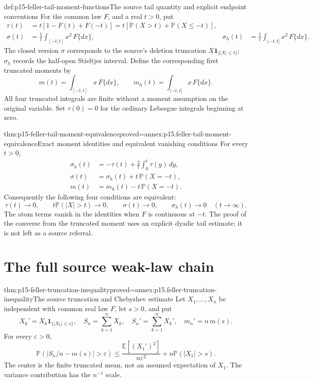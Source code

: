 \begin{hbdefinition}{def:p15-feller-tail-moment-functions}{The source tail quantity and explicit endpoint conventions}
For the common law \(F\), and a real \(t>0\), put
\[
 \begin{aligned}
 \tau(t)&=t[1-F(t)+F(-t)]
       =t[\mathbb P(X>t)+\mathbb P(X\leq-t)],\\
 \sigma(t)&=\frac1t\int_{[-t,t]}x^2\,F\{dx\},&
 \sigma_h(t)&=\frac1t\int_{(-t,t]}x^2\,F\{dx\}.
 \end{aligned}
\]
The closed version \(\sigma\) corresponds to the source's deletion
truncation \(X\mathbf1_{\{|X|\leq t\}}\); \(\sigma_h\) records
the half-open Stieltjes interval. Define the corresponding first
truncated moments by
\[
 m(t)=\int_{[-t,t]}x\,F\{dx\},\qquad
 m_h(t)=\int_{(-t,t]}x\,F\{dx\}.
\]
All four truncated integrals are finite without a moment assumption
on the original variable. Set \(\tau(0)=0\) for the ordinary
Lebesgue integrals beginning at zero.
\end{hbdefinition}

\begin{hbtheorem}{thm:p15-feller-tail-moment-equivalence}{proved=annex:p15.feller-tail-moment-equivalence}{Exact moment identities and equivalent vanishing conditions}
For every \(t>0\),
\[
 \begin{aligned}
 \sigma_h(t)&=-\tau(t)+\frac2t\int_0^t\tau(y)\,dy,\\
 \sigma(t)&=\sigma_h(t)+t\,\mathbb P(X=-t),\\
 m(t)&=m_h(t)-t\,\mathbb P(X=-t).
 \end{aligned}
\]
Consequently the following four conditions are equivalent:
\[
 \tau(t)\to0,\qquad
 t\mathbb P(|X|>t)\to0,\qquad
 \sigma(t)\to0,\qquad
 \sigma_h(t)\to0
                         \quad(t\to\infty).
\]
The atom terms vanish in the identities when \(F\) is continuous at
\(-t\). The proof of the converse from the truncated moment uses an
explicit dyadic tail estimate; it is not left as a source referral.
\end{hbtheorem}

\section{The full source weak-law chain}
\label{sec:p15-feller-generalized-weak-law}

\begin{hbtheorem}{thm:p15-feller-truncation-inequality}{proved=annex:p15.feller-truncation-inequality}{The source truncation and Chebyshev estimate}
Let \(X_1,\ldots,X_n\) be independent with common real law \(F\),
let \(s>0\), and put
\[
 X_k'=X_k\mathbf1_{\{|X_k|\leq s\}},\quad
 S_n=\sum_{k=1}^nX_k,\quad S_n'=\sum_{k=1}^nX_k',
 \quad m_n'=n\,m(s).
\]
For every \(\varepsilon>0\),
\[
 \mathbb P(|S_n/n-m(s)|>\varepsilon)
 \leq\frac{\mathbb E[(X_1')^2]}{n\varepsilon^2}
                         +n\mathbb P(|X_1|>s).
\]
The center is the finite truncated mean, not an assumed expectation
of \(X_1\). The variance contribution has the \(n^{-1}\) scale.
\end{hbtheorem}

